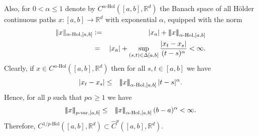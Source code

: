\documentclass[10pt]{article}
\numberwithin{equation}{section} %
\newcommand{\R}{\ensuremath{\mathbb{R}}}
\newcommand{\ltn}{\ensuremath{\left| \! \left| \! \left|}}
\newcommand{\rtn}{\ensuremath{\right| \! \right| \! \right|}}
\begin{document}
Also, for $0<\alpha \leq 1$ denote by $C^{\alpha\text{-Hol}}([a,b],\R^d)$ the Banach space of all H\"older continuous paths $x:[a,b]\to \R^d$ with exponential $\alpha$, equipped with the norm
\begin{eqnarray}
\|x\|_{\alpha\text{-Hol},[a,b]} &:=& |x_a| + \ltn x\rtn_{\alpha\text{-Hol},[a,b]}\notag\\
&=&  |x_a| +\sup_{(s,t)\in \Delta[a,b]} \frac{|x_t-x_s|}{(t-s)^{\alpha}}< \infty.
\end{eqnarray}
Clearly, if $x\in C^{\alpha\text{-Hol}}([a,b],\R^d)$ then for all $s,t\in [a,b]$ we have
\begin{eqnarray*}%
|x_t-x_s|&\leq& \ltn x\rtn_{\alpha\text{-Hol},[a,b]} |t-s|^\alpha.
\end{eqnarray*}
Hence, for all $p$ such that $p\alpha\geq 1$ we have
\begin{eqnarray}\label{pvar-Hol.norm}
\ltn x\rtn_{p\text{-var},[a,b]}&\leq& \ltn x\rtn_{\alpha\text{-Hol},[a,b]} (b-a)^\alpha<\infty.
\end{eqnarray} 
Therefore, $C^{1/p\text{-Hol}}([a,b],\R^d)\subset \widehat{C}^p([a,b],\R^d)$.
\end{document}

